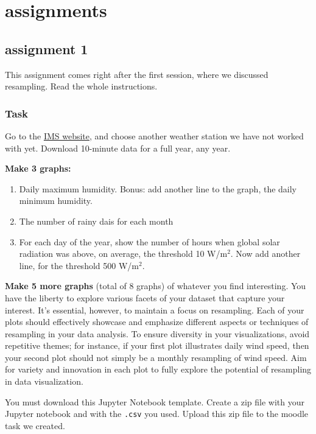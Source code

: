 \documentclass[
  letterpaper,
  DIV=11,
  numbers=noendperiod,
  oneside]{scrreprt}
\providecommand{\tightlist}{%
  \setlength{\itemsep}{0pt}\setlength{\parskip}{0pt}}\usepackage{longtable,booktabs,array}
\begin{document}
\part{assignments}

\hypertarget{assignment-1}{%
\chapter{assignment 1}\label{assignment-1}}

This assignment comes right after the first session, where we discussed
resampling. Read the whole instructions.

\hypertarget{task}{%
\section{Task}\label{task}}

Go to the \href{https://ims.gov.il/en/data_gov}{IMS website}, and choose
another weather station we have not worked with yet. Download 10-minute
data for a full year, any year.

\textbf{Make 3 graphs:}

\begin{enumerate}
\def\labelenumi{\arabic{enumi}.}
\tightlist
\item
  Daily maximum humidity. Bonus: add another line to the graph, the
  daily minimum humidity.
\item
  The number of rainy dais for each month
\item
  For each day of the year, show the number of hours when global solar
  radiation was above, on average, the threshold 10 W/m\(^2\). Now add
  another line, for the threshold 500 W/m\(^2\).
\end{enumerate}

\textbf{Make 5 more graphs} (total of 8 graphs) of whatever you find
interesting. You have the liberty to explore various facets of your
dataset that capture your interest. It's essential, however, to maintain
a focus on resampling. Each of your plots should effectively showcase
and emphasize different aspects or techniques of resampling in your data
analysis. To ensure diversity in your visualizations, avoid repetitive
themes; for instance, if your first plot illustrates daily wind speed,
then your second plot should not simply be a monthly resampling of wind
speed. Aim for variety and innovation in each plot to fully explore the
potential of resampling in data visualization.

You must download this Jupyter Notebook template. Create a zip file with
your Jupyter notebook and with the \texttt{.csv} you used. Upload this
zip file to the moodle task we created.
\end{document}
